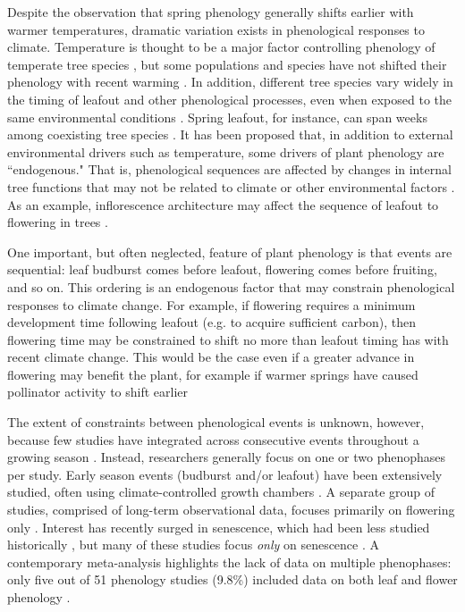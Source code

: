 \documentclass{article}
\begin{document}
\par Despite the observation that spring phenology generally shifts earlier with warmer temperatures, dramatic variation exists in phenological responses to climate. Temperature is thought to be a major factor controlling phenology of temperate tree species \citep{parmesan2006,richardson2006,morin2010,schwartz2013,clark2014b}, but some populations and species have not shifted their phenology with recent warming \citep{wolkovich2012}. In addition, different tree species vary widely in the timing of leafout and other phenological processes, even when exposed to the same environmental conditions \citep{lechowicz1984,primack2009c}. Spring leafout, for instance, can span weeks among coexisting tree species \citep{lechowicz1984}. It has been proposed that, in addition to external environmental drivers such as temperature, some drivers of plant phenology are ``endogenous." That is, phenological sequences are affected by changes in internal tree functions that may not be related to climate or other environmental factors \citep{borchert1992,marco2002}. As an example, inflorescence architecture may affect the sequence of leafout to flowering in trees \citep{marco2002}. 

\par One important, but often neglected, feature of plant phenology is that events are sequential: leaf budburst comes before leafout, flowering comes before fruiting, and so on. This ordering is an endogenous factor that may constrain phenological responses to climate change. For example, if flowering requires a minimum development time following leafout (e.g. to acquire sufficient carbon), then flowering time may be constrained to shift no more than leafout timing has with recent climate change. This would be the case even if a greater advance in flowering may benefit the plant, for example if warmer springs have caused pollinator activity to shift earlier \citep{polgar2013, thackeray2010}

\par The extent of constraints between phenological events is unknown, however, because few studies have integrated across consecutive events throughout a growing season \citep{wolkovich2014}. Instead, researchers generally focus on one or two phenophases per study. Early season events (budburst and/or leafout) have been extensively studied, often using climate-controlled growth chambers \citep[e.g.,][]{basler2012,laube2014}. A separate group of studies, comprised of long-term observational data, focuses primarily on flowering only \citep[e.g.,] []{fitter2002,millerrushing2008}. Interest has recently surged in senescence, which had been less studied historically \citep {parmesan2006}, but many of these studies focus \textit{only} on senescence \citep[e.g.,][]{taylor2008,archetti2013,jeong2014}. A contemporary meta-analysis highlights the lack of data on multiple phenophases: only five out of 51 phenology studies (9.8\%) included data on both leaf and flower phenology \citep{wolkovich2012}. 
\end{document}

